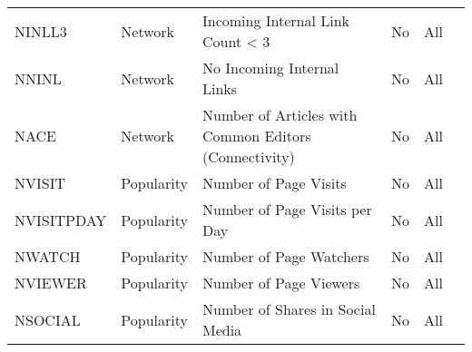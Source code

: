 \begin{longtable}{l l m{} c c m{}}
    NINLL3 & Network & Incoming Internal Link Count < 3 & No & All & \cite{Ferschke2012_lr43} \\
    NNINL & Network & No Incoming Internal Links & No & All & \cite{Ferschke2012_lr43} \\
    NACE & Network & Number of Articles with Common Editors (Connectivity) & No & All & \cite{Anderka2012_lr17, Couto2021_lr161, Stvilia2007_lr1012, Stvilia2005_lr1013} \\
    NVISIT & Popularity & Number of Page Visits & No & All & \cite{Lewoniewski2018_lr62, Seyedsadr2016_lr2005, Ge2020_lr2008} \\
    NVISITPDAY & Popularity & Number of Page Visits per Day & No & All & \cite{Seyedsadr2016_lr2005} \\
    NWATCH & Popularity & Number of Page Watchers & No & All & \cite{Wecel2015_lr34, Lewoniewski2018_lr62, Ge2020_lr2008} \\
    NVIEWER & Popularity & Number of Page Viewers & No & All & \cite{Saengthongpattana2018_lr150} \\
    NSOCIAL & Popularity & Number of Shares in Social Media & No & All & \cite{Yahya2020_lr2011} \\

\end{longtable}